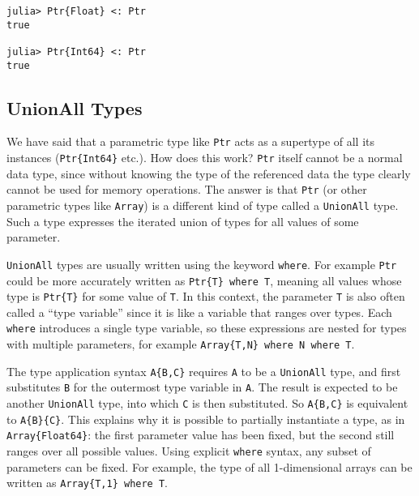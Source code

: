 \documentclass[
]{article}
\begin{document}
\begin{verbatim}
julia> Ptr{Float} <: Ptr
true

julia> Ptr{Int64} <: Ptr
true
\end{verbatim}

\hypertarget{unionall-types}{%
\subsection{UnionAll Types}\label{unionall-types}}

We have said that a parametric type like \texttt{Ptr} acts as a
supertype of all its instances (\texttt{Ptr\{Int64\}} etc.). How does
this work? \texttt{Ptr} itself cannot be a normal data type, since
without knowing the type of the referenced data the type clearly cannot
be used for memory operations. The answer is that \texttt{Ptr} (or other
parametric types like \texttt{Array}) is a different kind of type called
a \texttt{UnionAll} type. Such a type expresses the iterated union of
types for all values of some parameter.

\texttt{UnionAll} types are usually written using the keyword
\texttt{where}. For example \texttt{Ptr} could be more accurately
written as \texttt{Ptr\{T\}\ where\ T}, meaning all values whose type is
\texttt{Ptr\{T\}} for some value of \texttt{T}. In this context, the
parameter \texttt{T} is also often called a ``type variable'' since it
is like a variable that ranges over types. Each \texttt{where}
introduces a single type variable, so these expressions are nested for
types with multiple parameters, for example
\texttt{Array\{T,N\}\ where\ N\ where\ T}.

The type application syntax \texttt{A\{B,C\}} requires \texttt{A} to be
a \texttt{UnionAll} type, and first substitutes \texttt{B} for the
outermost type variable in \texttt{A}. The result is expected to be
another \texttt{UnionAll} type, into which \texttt{C} is then
substituted. So \texttt{A\{B,C\}} is equivalent to \texttt{A\{B\}\{C\}}.
This explains why it is possible to partially instantiate a type, as in
\texttt{Array\{Float64\}}: the first parameter value has been fixed, but
the second still ranges over all possible values. Using explicit
\texttt{where} syntax, any subset of parameters can be fixed. For
example, the type of all 1-dimensional arrays can be written as
\texttt{Array\{T,1\}\ where\ T}.
\end{document}
